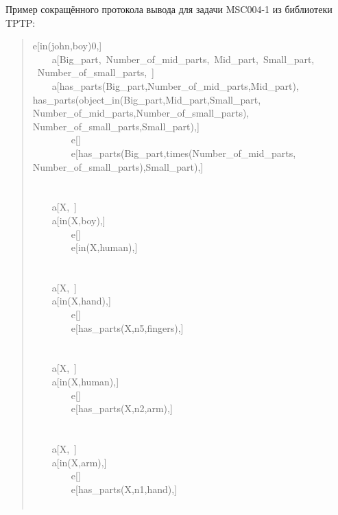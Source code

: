 \newpage


Пример сокращённого протокола вывода для задачи MSC004-1 из библиотеки TPTP:
\begin{quote}
\tt\raggedright\noindent
e[in(john,boy)0,]\\
~~~~a[Big\_part,~Number\_of\_mid\_parts,~Mid\_part,~Small\_part,\\ ~Number\_of\_small\_parts,~]\\
~~~~a[has\_parts(Big\_part,Number\_of\_mid\_parts,Mid\_part),\\ has\_parts(object\_in(Big\_part,Mid\_part,Small\_part,\\ Number\_of\_mid\_parts,Number\_of\_small\_parts),\\ Number\_of\_small\_parts,Small\_part),]\\
~~~~~~~~e[]\\
~~~~~~~~e[has\_parts(Big\_part,times(Number\_of\_mid\_parts,\\ Number\_of\_small\_parts),Small\_part),]\\
~\\
~\\
~~~~a[X,~]\\
~~~~a[in(X,boy),]\\
~~~~~~~~e[]\\
~~~~~~~~e[in(X,human),]\\
~\\
~\\
~~~~a[X,~]\\
~~~~a[in(X,hand),]\\
~~~~~~~~e[]\\
~~~~~~~~e[has\_parts(X,n5,fingers),]\\
~\\
~\\
~~~~a[X,~]\\
~~~~a[in(X,human),]\\
~~~~~~~~e[]\\
~~~~~~~~e[has\_parts(X,n2,arm),]\\
~\\
~\\
~~~~a[X,~]\\
~~~~a[in(X,arm),]\\
~~~~~~~~e[]\\
~~~~~~~~e[has\_parts(X,n1,hand),]\\
~\\

\end{quote}
